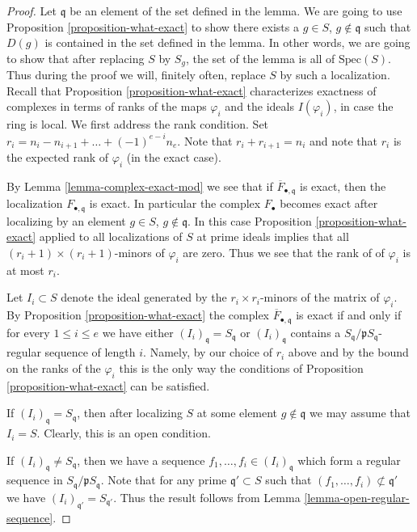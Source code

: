 \begin{proof}
Let $\mathfrak q$ be an element of the set defined in the lemma.
We are going to use Proposition \ref{proposition-what-exact}
to show there exists a $g \in S$, $g \not \in \mathfrak q$
such that $D(g)$ is contained in the set defined in the lemma.
In other words, we are going to show that after replacing $S$
by $S_g$, the set of the lemma is all of $\text{Spec}(S)$.
Thus during the proof we will, finitely often, replace
$S$ by such a localization.
Recall that Proposition \ref{proposition-what-exact}
characterizes exactness of complexes
in terms of ranks of the maps $\varphi_i$ and the ideals
$I(\varphi_i)$, in case the ring is local. We first address
the rank condition. Set
$r_i = n_i - n_{i+1} + \ldots + (-1)^{e - i} n_e$.
Note that $r_i + r_{i+1} = n_i$ and note that
$r_i$ is the expected rank of $\varphi_i$ (in the
exact case).

\medskip\noindent
By Lemma \ref{lemma-complex-exact-mod} we see that if
$\overline{F}_{\bullet, \mathfrak q}$ is exact, then
the localization $F_{\bullet, \mathfrak q}$ is exact.
In particular the complex $F_\bullet$ becomes
exact after localizing by an element
$g \in S$, $g \not \in \mathfrak q$. In this case
Proposition \ref{proposition-what-exact} applied
to all localizations of $S$ at prime ideals
implies that all $(r_i + 1) \times (r_i + 1)$-minors
of $\varphi_i$ are zero. Thus we see that the rank of
of $\varphi_i$ is at most $r_i$.

\medskip\noindent
Let $I_i \subset S$ denote the ideal generated
by the $r_i \times r_i$-minors of the matrix
of $\varphi_i$. By Proposition \ref{proposition-what-exact}
the complex $\overline{F}_{\bullet, \mathfrak q}$ is exact
if and only if for every $1 \leq i \leq e$ we have
either $(I_i)_{\mathfrak q} = S_{\mathfrak q}$ or
$(I_i)_{\mathfrak q}$ contains a $S_{\mathfrak q}/\mathfrak p
S_{\mathfrak q}$-regular sequence of length $i$.
Namely, by our choice of $r_i$ above and by the
bound on the ranks of the $\varphi_i$ this is the
only way the conditions of Proposition \ref{proposition-what-exact}
can be satisfied.

\medskip\noindent
If $(I_i)_{\mathfrak q} = S_{\mathfrak q}$, then after localizing $S$ at
some element $g \not\in \mathfrak q$ we may assume that
$I_i = S$. Clearly, this is an open condition.

\medskip\noindent
If $(I_i)_{\mathfrak q} \not = S_{\mathfrak q}$, then we have
a sequence $f_1, \ldots, f_i \in (I_i)_{\mathfrak q}$ which
form a regular sequence in $S_{\mathfrak q}/\mathfrak pS_{\mathfrak q}$.
Note that for any prime $\mathfrak q' \subset S$ such that
$(f_1, \ldots, f_i) \not \subset \mathfrak q'$ we have
$(I_i)_{\mathfrak q'} = S_{\mathfrak q'}$.
Thus the result follows from Lemma \ref{lemma-open-regular-sequence}.
\end{proof}


